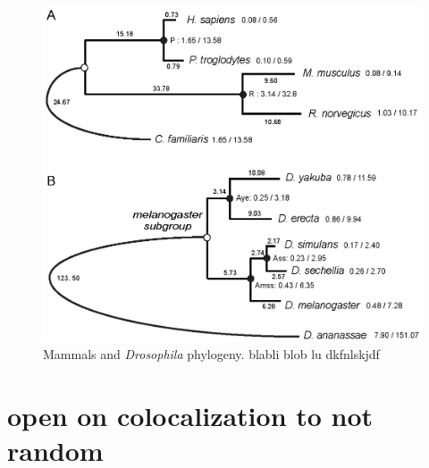 \begin{figure}[htpb] 
\centering 
\includegraphics[width=\textwidth]{tex_source/figures/gssa/phylogenies.png}
\caption[Mammals and \textit{Drosophila} phylogeny]{Mammals and
  \textit{Drosophila} phylogeny. blabli blob lu dkfnlskjdf}
\label{fig:phylogeny}
\end{figure}


\section{open on colocalization to not random}

